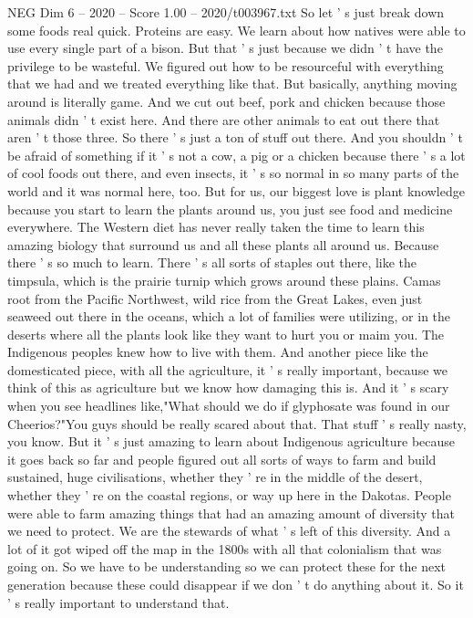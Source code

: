 \begin{textsample}{NEG Dim 6 – 2020 – Score 1.00 – 2020/t003967.txt}
So let ' s just break down some foods real quick.
Proteins are easy.
We learn about how natives were able to use every single part of a bison.
But that ' s just because we didn ' t have the privilege to be wasteful.
We figured out how to be resourceful with everything that we had and we treated everything like that.
But basically, anything moving around is literally game.
And we cut out beef, pork and chicken because those animals didn ' t exist here.
And there are other animals to eat out there that aren ' t those three.
So there ' s just a ton of stuff out there.
And you shouldn ' t be afraid of something if it ' s not a cow, a pig or a chicken because there ' s a lot of cool foods out there, and even insects, it ' s so normal in so many parts of the world and it was normal here, too.
But for us, our biggest love is plant knowledge because you start to learn the plants around us, you just see food and medicine everywhere.
The Western diet has never really taken the time to learn this amazing biology that surround us and all these plants all around us.
Because there ' s so much to learn.
There ' s all sorts of staples out there, like the timpsula, which is the prairie turnip which grows around these plains.
Camas root from the Pacific Northwest, wild rice from the Great Lakes, even just seaweed out there in the oceans, which a lot of families were utilizing, or in the deserts where all the plants look like they want to hurt you or maim you.
The Indigenous peoples knew how to live with them.
And another piece like the domesticated piece, with all the agriculture, it ' s really important, because we think of this as agriculture but we know how damaging this is.
And it ' s scary when you see headlines like,"What should we do if glyphosate was found in our Cheerios?"You guys should be really scared about that.
That stuff ' s really nasty, you know.
But it ' s just amazing to learn about Indigenous agriculture because it goes back so far and people figured out all sorts of ways to farm and build sustained, huge civilisations, whether they ' re in the middle of the desert, whether they ' re on the coastal regions, or way up here in the Dakotas.
People were able to farm amazing things that had an amazing amount of diversity that we need to protect.
We are the stewards of what ' s left of this diversity.
And a lot of it got wiped off the map in the 1800s with all that colonialism that was going on.
So we have to be understanding so we can protect these for the next generation because these could disappear if we don ' t do anything about it.
So it ' s really important to understand that.

\end{textsample}
